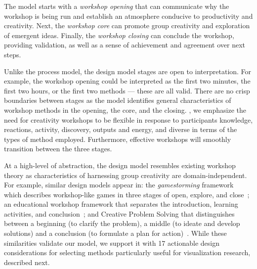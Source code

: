 The model starts with a \emph{workshop opening} that can communicate why the workshop is being run and establish an atmosphere conducive to productivity and creativity. Next, the \emph{workshop core} can promote group creativity and exploration of emergent ideas. Finally, the \emph{workshop closing} can conclude the workshop, providing validation, as well as a sense of achievement and agreement over next steps.

Unlike the process model, the design model stages are open to interpretation. For example, the workshop opening could be interpreted as the first two minutes, the first two hours, or the first two methods --- these are all valid. There are no crisp boundaries between stages as the model identifies general characteristics of workshop methods in the opening, the core, and the closing.  , we emphasize the need for creativity workshops to be flexible in response to participants knowledge, reactions, activity, discovery, outputs and energy, and diverse in terms of the types of method employed. Furthermore, effective workshops will smoothly transition between the three stages.

At a high-level of abstraction, the design model resembles existing workshop theory as characteristics of harnessing group creativity are domain-independent. For example, similar design models appear in: the \emph{gamestorming} framework which describes workshop-like games in three stages of open, explore, and close~\cite{Macanufo2010}; an educational workshop framework that separates the introduction, learning activities, and conclusion~\cite{Brooks-Harris1999}; and Creative Problem Solving that distinguishes between a beginning (to clarify the problem), a middle (to ideate and develop solutions) and a conclusion (to formulate a plan for action)~\cite{CreativeEducationFoundation2015}. While these similarities validate our model, we support it with 17 actionable design considerations for selecting methods particularly useful for visualization research, described next.

